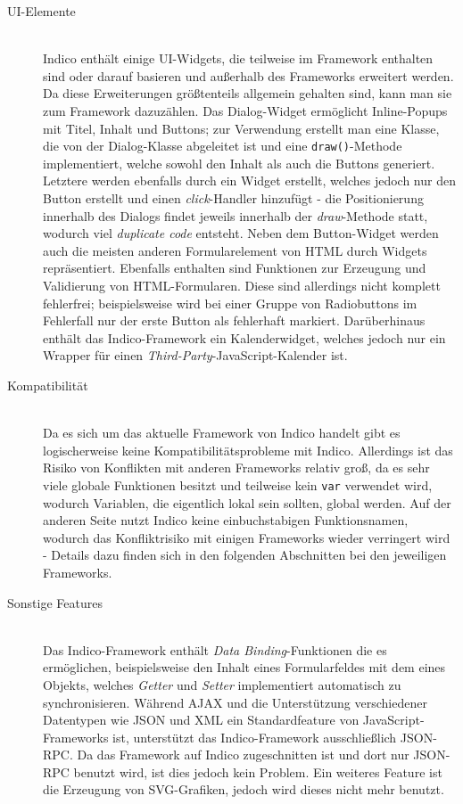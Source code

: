 \begin{description}
\item[UI-Elemente] \hfill \\
Indico enthält einige UI-Widgets, die teilweise im Framework enthalten sind oder darauf basieren und
außerhalb des Frameworks erweitert werden. Da diese Erweiterungen größtenteils allgemein gehalten
sind, kann man sie zum Framework dazuzählen. Das Dialog-Widget ermöglicht Inline-Popups mit Titel,
Inhalt und Buttons; zur Verwendung erstellt man eine Klasse, die von der Dialog-Klasse abgeleitet
ist und eine \lstinline{draw()}-Methode implementiert, welche sowohl den Inhalt als auch die Buttons
generiert. Letztere werden ebenfalls durch ein Widget erstellt, welches jedoch nur den Button
erstellt und einen \emph{click}-Handler hinzufügt - die Positionierung innerhalb des Dialogs findet
jeweils innerhalb der \emph{draw}-Methode statt, wodurch viel \emph{duplicate code} entsteht.
Neben dem Button-Widget werden auch die meisten anderen Formularelement von HTML durch Widgets
repräsentiert. Ebenfalls enthalten sind Funktionen zur Erzeugung und Validierung von
HTML-Formularen. Diese sind allerdings nicht komplett fehlerfrei; beispielsweise wird bei einer
Gruppe von Radiobuttons im Fehlerfall nur der erste Button als fehlerhaft markiert. Darüberhinaus
enthält das Indico-Framework ein Kalenderwidget, welches jedoch nur ein Wrapper für einen
\emph{Third-Party}-JavaScript-Kalender ist.

\item[Kompatibilität] \hfill \\
Da es sich um das aktuelle Framework von Indico handelt gibt es logischerweise keine
Kompatibilitätsprobleme mit Indico. Allerdings ist das Risiko von Konflikten mit anderen Frameworks
relativ groß, da es sehr viele globale Funktionen besitzt und teilweise kein \lstinline{var}
verwendet wird, wodurch Variablen, die eigentlich lokal sein sollten, global werden. Auf der anderen
Seite nutzt Indico keine einbuchstabigen Funktionsnamen, wodurch das Konfliktrisiko mit einigen
Frameworks wieder verringert wird - Details dazu finden sich in den folgenden Abschnitten bei den
jeweiligen Frameworks.

\item[Sonstige Features] \hfill \\
Das Indico-Framework enthält \emph{Data Binding}-Funktionen die es ermöglichen, beispielsweise den
Inhalt eines Formularfeldes mit dem eines Objekts, welches \emph{Getter} und \emph{Setter}
implementiert automatisch zu synchronisieren. Während AJAX und die Unterstützung verschiedener
Datentypen wie JSON und XML ein Standardfeature von JavaScript-Frameworks ist, unterstützt das
Indico-Framework ausschließlich JSON-RPC. Da das Framework auf Indico zugeschnitten ist und dort nur
JSON-RPC benutzt wird, ist dies jedoch kein Problem. Ein weiteres Feature ist die Erzeugung von
SVG-Grafiken, jedoch wird dieses nicht mehr benutzt.


\end{description}
